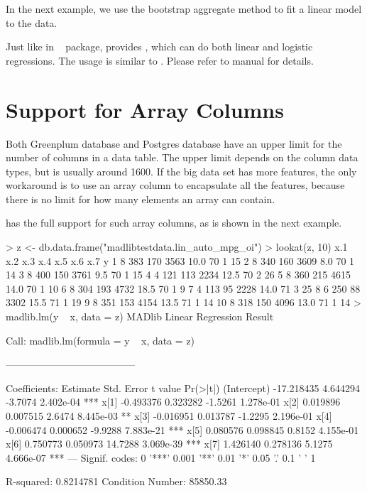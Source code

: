 In the next example, we use the bootstrap aggregate method to fit a
linear model to the data.


Just like  in ~\citep{stats} package,
 provides , which can do both linear
and logistic regressions. The usage is similar to . Please
refer to  manual \citep{pivotalr} for details.

\section{Support for Array Columns}

Both Greenplum database and Postgres database have an upper limit for
the number of columns in a data table. The upper limit depends on the
column data types, but is usually around 1600. If the big data set has
more features, the only workaround is to use an array column to
encapsulate all the features, because there is no limit for how many
elements an array can contain.

 has the full support for such array columns, as is
shown in the next example.

\begin{example}
> z <- db.data.frame("madlibtestdata.lin_auto_mpg_oi")
> lookat(z, 10)
   x.1 x.2 x.3 x.4 x.5 x.6 x.7  y
1     8  383  170 3563 10.0   70    1 15
2     8  340  160 3609  8.0   70    1 14
3     8  400  150 3761  9.5   70    1 15
4     4  121  113 2234 12.5   70    2 26
5     8  360  215 4615 14.0   70    1 10
6     8  304  193 4732 18.5   70    1  9
7     4  113   95 2228 14.0   71    3 25
8     6  250   88 3302 15.5   71    1 19
9     8  351  153 4154 13.5   71    1 14
10    8  318  150 4096 13.0   71    1 14
> madlib.lm(y ~ x, data = z)
MADlib Linear Regression Result

Call:
madlib.lm(formula = y ~ x, data = z)

---------------------------------------

Coefficients:
              Estimate Std. Error t value      Pr(>|t|)
(Intercept) -17.218435   4.644294 -3.7074 2.402e-04 ***
x[1]         -0.493376   0.323282 -1.5261 1.278e-01
x[2]          0.019896   0.007515  2.6474 8.445e-03 **
x[3]         -0.016951   0.013787 -1.2295 2.196e-01
x[4]         -0.006474   0.000652 -9.9288 7.883e-21 ***
x[5]          0.080576   0.098845  0.8152 4.155e-01
x[6]          0.750773   0.050973 14.7288 3.069e-39 ***
x[7]          1.426140   0.278136  5.1275 4.666e-07 ***
---
Signif. codes:  0 '***' 0.001 '**' 0.01 '*' 0.05 '.' 0.1 ' ' 1

R-squared: 0.8214781
Condition Number: 85850.33
\end{example}

